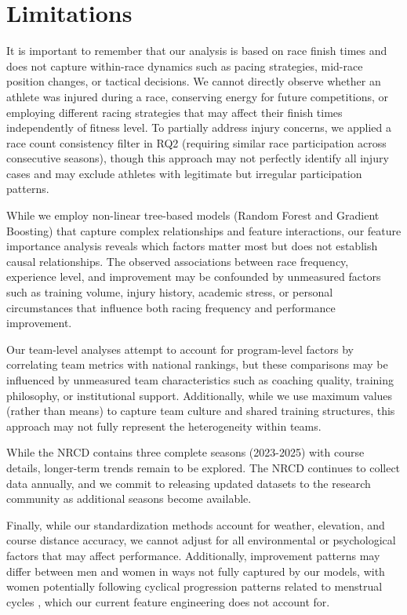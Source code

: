 \documentclass[suppldata]{interact}
\theoremstyle{plain}%
\theoremstyle{definition}
\theoremstyle{remark}
\begin{document}
  \FloatBarrier

\section{Limitations}

It is important to remember that our analysis is based on race finish times and does not capture within-race dynamics such as pacing strategies, mid-race position changes, or tactical decisions. We cannot directly observe whether an athlete was injured during a race, conserving energy for future competitions, or employing different racing strategies that may affect their finish times independently of fitness level. To partially address injury concerns, we applied a race count consistency filter in RQ2 (requiring similar race participation across consecutive seasons), though this approach may not perfectly identify all injury cases and may exclude athletes with legitimate but irregular participation patterns.

While we employ non-linear tree-based models (Random Forest and Gradient Boosting) that capture complex relationships and feature interactions, our feature importance analysis reveals which factors matter most but does not establish causal relationships. The observed associations between race frequency, experience level, and improvement may be confounded by unmeasured factors such as training volume, injury history, academic stress, or personal circumstances that influence both racing frequency and performance improvement.

Our team-level analyses attempt to account for program-level factors by correlating team metrics with national rankings, but these comparisons may be influenced by unmeasured team characteristics such as coaching quality, training philosophy, or institutional support. Additionally, while we use maximum values (rather than means) to capture team culture and shared training structures, this approach may not fully represent the heterogeneity within teams.

While the NRCD contains three complete seasons (2023-2025) with course details, longer-term trends remain to be explored. The NRCD continues to collect data annually, and we commit to releasing updated datasets to the research community as additional seasons become available.

Finally, while our standardization methods account for weather, elevation, and course distance accuracy, we cannot adjust for all environmental or psychological factors that may affect performance. Additionally, improvement patterns may differ between men and women in ways not fully captured by our models, with women potentially following cyclical progression patterns related to menstrual cycles \cite{smith2022auditing}, which our current feature engineering does not account for.
\end{document}
